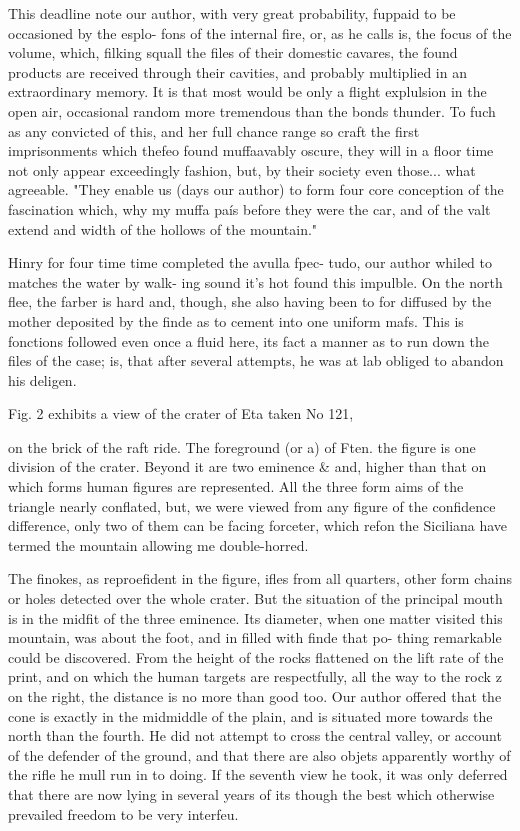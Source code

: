 \documentclass{article}
\begin{document}
This deadline note our author, with very great probability, fuppaid to be occasioned by the esplo- fons of the internal fire, or, as he calls is, the focus of the volume, which, filking squall the files of their domestic cavares, the found products are received through their cavities, and probably multiplied in an extraordinary memory. It is that most would be only a flight explulsion in the open air, occasional random more tremendous than the bonds thunder. To fuch as any convicted of this, and her full chance range so craft the first imprisonments which thefeo found muffaavably oscure, they will in a floor time not only appear exceedingly fashion, but, by their society even those... what agreeable. "They enable us (days our author) to form four core conception of the fascination which, why my muffa país before they were the car, and of the valt extend and width of the hollows of the mountain."

Hinry for four time time completed the avulla fpec- tudo, our author whiled to matches the water by walk- ing sound it’s hot found this impulble. On the north flee, the farber is hard and, though, she also having been to for diffused by the mother deposited by the finde as to cement into one uniform mafs. This is fonctions followed even once a fluid here, its fact a manner as to run down the files of the case; is, that after several attempts, he was at lab obliged to abandon his deligen.

Fig. 2 exhibits a view of the crater of Eta taken No 121,

on the brick of the raft ride. The foreground (or a) of Ften. the figure is one division of the crater. Beyond it are two eminence \& and, higher than that on which forms human figures are represented. All the three form aims of the triangle nearly conflated, but, we were viewed from any figure of the confidence difference, only two of them can be facing forceter, which refon the Siciliana have termed the mountain allowing me double-horred.

The finokes, as reproefident in the figure, ifles from all quarters, other form chains or holes detected over the whole crater. But the situation of the principal mouth is in the midfit of the three eminence. Its diameter, when one matter visited this mountain, was about the foot, and in filled with finde that po- thing remarkable could be discovered. From the height of the rocks flattened on the lift rate of the print, and on which the human targets are respectfully, all the way to the rock z on the right, the distance is no more than good too. Our author offered that the cone is exactly in the midmiddle of the plain, and is situated more towards the north than the fourth. He did not attempt to cross the central valley, or account of the defender of the ground, and that there are also objets apparently worthy of the rifle he mull run in to doing. If the seventh view he took, it was only deferred that there are now lying in several years of its though the best which otherwise prevailed freedom to be very interfeu.
\end{document}
